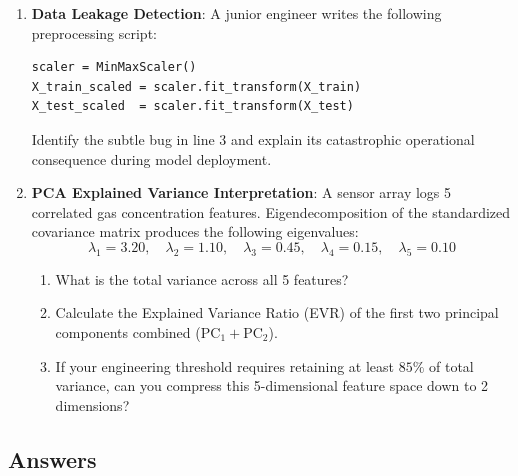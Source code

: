 \begin{checkyourself}
\begin{enumerate}
    \item \textbf{Data Leakage Detection}:
    A junior engineer writes the following preprocessing script:
    \begin{lstlisting}[style=pythonstyle]
scaler = MinMaxScaler()
X_train_scaled = scaler.fit_transform(X_train)
X_test_scaled  = scaler.fit_transform(X_test)
    \end{lstlisting}
    Identify the subtle bug in line 3 and explain its catastrophic operational consequence during model deployment.

    \item \textbf{PCA Explained Variance Interpretation}:
    A sensor array logs 5 correlated gas concentration features. Eigendecomposition of the standardized covariance matrix produces the following eigenvalues:
    \begin{equation*}
    \lambda_1 = 3.20, \quad \lambda_2 = 1.10, \quad \lambda_3 = 0.45, \quad \lambda_4 = 0.15, \quad \lambda_5 = 0.10
    \end{equation*}
    \begin{enumerate}[label=(\alph*)]
        \item What is the total variance across all 5 features?
        \item Calculate the Explained Variance Ratio (EVR) of the first two principal components combined ($\text{PC}_1 + \text{PC}_2$).
        \item If your engineering threshold requires retaining at least $85\%$ of total variance, can you compress this 5-dimensional feature space down to 2 dimensions?
    \end{enumerate}
\end{enumerate}
\end{checkyourself}

\subsection*{Answers}

